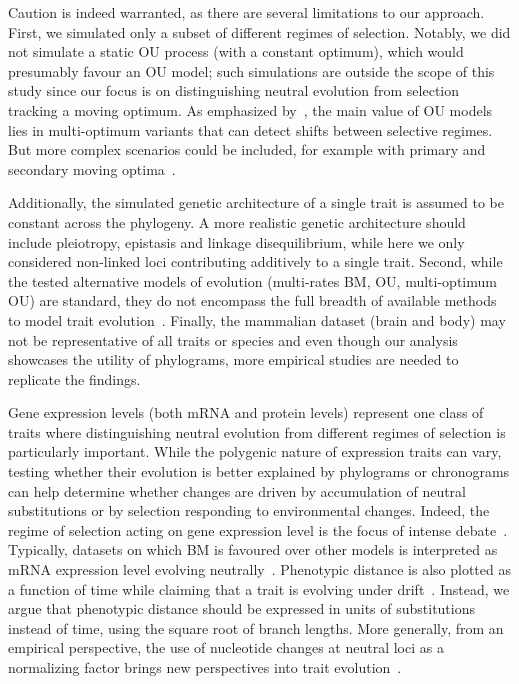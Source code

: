 \documentclass{article}
\begin{document}
Caution is indeed warranted, as there are several limitations to our approach.
First, we simulated only a subset of different regimes of selection.
Notably, we did not simulate a static OU process (with a constant optimum), which would presumably favour an OU model; such simulations are outside the scope of this study since our focus is on distinguishing neutral evolution from selection tracking a moving optimum.
As emphasized by~\citet{grabowski_cautionary_2023}, the main value of OU models lies in multi-optimum variants that can detect shifts between selective regimes.
But more complex scenarios could be included, for example with primary and secondary moving optima~\citep{hansen_three_2024}.

Additionally, the simulated genetic architecture of a single trait is assumed to be constant across the phylogeny.
A more realistic genetic architecture should include pleiotropy, epistasis and linkage disequilibrium, while here we only considered non-linked loci contributing additively to a single trait.
Second, while the tested alternative models of evolution (multi-rates BM, OU, multi-optimum OU) are standard, they do not encompass the full breadth of available methods to model trait evolution~\citep{pennell_geiger_2014, hohna_revbayes_2016}.
Finally, the mammalian dataset (brain and body) may not be representative of all traits or species and even though our analysis showcases the utility of phylograms, more empirical studies are needed to replicate the findings.

Gene expression levels (both mRNA and protein levels) represent one class of traits where distinguishing neutral evolution from different regimes of selection is particularly important.
While the polygenic nature of expression traits can vary, testing whether their evolution is better explained by phylograms or chronograms can help determine whether changes are driven by accumulation of neutral substitutions or by selection responding to environmental changes.
Indeed, the regime of selection acting on gene expression level is the focus of intense debate~\citep{signor_evolution_2018, price_detecting_2022, bertram_cagee_2023, dimayacyac_evaluating_2023}.
Typically, datasets on which BM is favoured over other models is interpreted as mRNA expression level evolving neutrally~\citep{khaitovich_evolution_2006, catalan_drift_2019, dimayacyac_evaluating_2023}.
Phenotypic distance is also plotted as a function of time while claiming that a trait is evolving under drift~\citep{jiang_decoupling_2023}.
Instead, we argue that phenotypic distance should be expressed in units of substitutions instead of time, using the square root of branch lengths.
More generally, from an empirical perspective, the use of nucleotide changes at neutral loci as a normalizing factor brings new perspectives into trait evolution~\citep{latrille_detecting_2024}.
\end{document}
